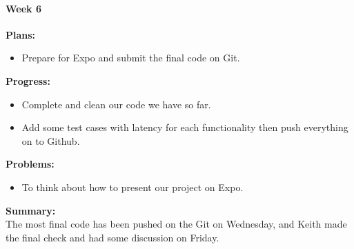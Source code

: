 \paragraph{Week 6}
\begin{adjustwidth}{2.5em}{0pt}
    \vspace{-0.5cm}\textbf{Plans:}
    \vspace{-0.5cm}
    \begin{itemize}
        \item Prepare for Expo and submit the final code on Git.
    \end{itemize} 
    \vspace{-0.3cm}\textbf{Progress:}
    \vspace{-0.5cm}
    \begin{itemize}
        \item Complete and clean our code we have so far.
        \item Add some test cases with latency for each functionality then push everything on to Github.
    \end{itemize} 
    \vspace{-0.3cm}\textbf{Problems:}
    \vspace{-0.5cm}
    \begin{itemize}
        \item To think about how to present our project on Expo.
    \end{itemize}  
    \vspace{-0.3cm}\noindent\textbf{Summary:}\\
    \noindent The most final code has been pushed on the Git on Wednesday, and Keith made the final check 
    and had some discussion on Friday. \\
\end{adjustwidth} 

